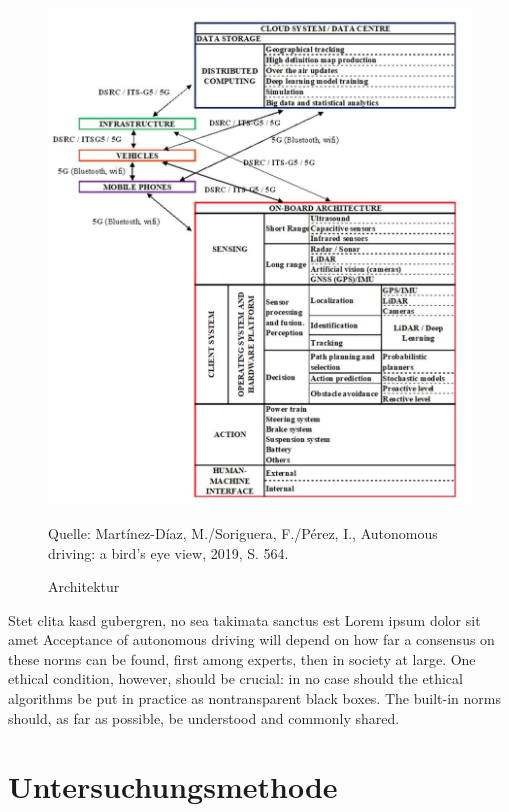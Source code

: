 \begin{figure}
	\caption[Architektur]{Architektur}
	\centering
	\includegraphics[]{assets/figures/Architektur.jpg}
									
	Quelle: Martínez-Díaz, M./Soriguera, F./Pérez, I., Autonomous driving: a bird's eye view, 2019, S. 564.	
\end{figure}

Stet clita kasd gubergren, no sea takimata sanctus est Lorem ipsum dolor sit amet Acceptance of autonomous driving will depend on how far a consensus on these norms can be found, first among experts, then in society at large. 
One ethical condition, however, should be crucial: in no case should the ethical algorithms be put in practice as nontransparent black boxes. 
The built-in norms should, as far as possible, be understood and commonly shared.

\section{Untersuchungsmethode}

